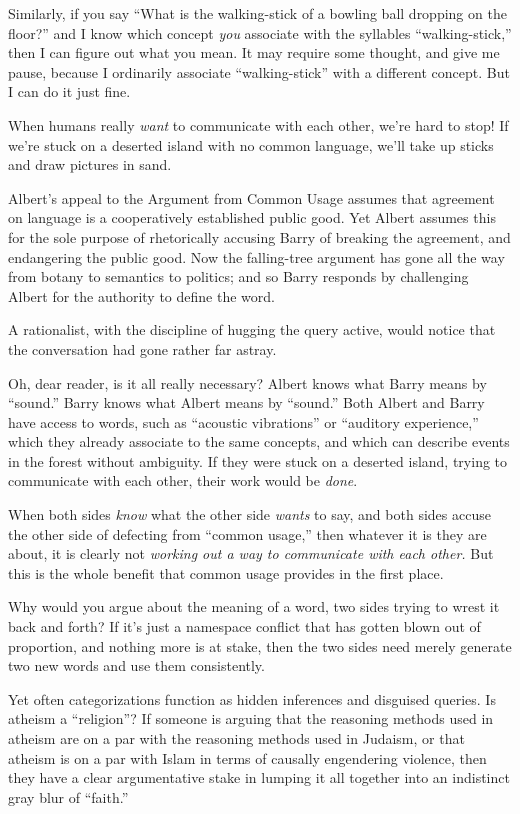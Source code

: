 {
 Similarly, if you say ``What is the walking-stick
of a bowling ball dropping on the floor?'' and I know
which concept \textit{you} associate with the syllables
``walking-stick,'' then I can figure
out what you mean. It may require some thought, and give me pause,
because I ordinarily associate
``walking-stick'' with a different
concept. But I can do it just fine.}

{
 When humans really \textit{want} to communicate with each other,
we're hard to stop! If we're stuck on a
deserted island with no common language, we'll take up
sticks and draw pictures in sand.}

{
 Albert's appeal to the Argument from Common Usage
assumes that agreement on language is a cooperatively established
public good. Yet Albert assumes this for the sole purpose of
rhetorically accusing Barry of breaking the agreement, and endangering
the public good. Now the falling-tree argument has gone all the way
from botany to semantics to politics; and so Barry responds by
challenging Albert for the authority to define the word.}

{
 A rationalist, with the discipline of hugging the query active,
would notice that the conversation had gone rather far astray.}

{
 Oh, dear reader, is it all really necessary? Albert knows what
Barry means by ``sound.'' Barry
knows what Albert means by
``sound.'' Both Albert and Barry
have access to words, such as ``acoustic
vibrations'' or ``auditory
experience,'' which they already associate to the
same concepts, and which can describe events in the forest without
ambiguity. If they were stuck on a deserted island, trying to
communicate with each other, their work would be \textit{done}.}

{
 When both sides \textit{know} what the other side \textit{wants}
to say, and both sides accuse the other side of defecting from
``common usage,'' then whatever it
is they are about, it is clearly not \textit{working out a way to
communicate with each other.} But this is the whole benefit that common
usage provides in the first place.}

{
 Why would you argue about the meaning of a word, two sides trying
to wrest it back and forth? If it's just a namespace
conflict that has gotten blown out of proportion, and nothing more is
at stake, then the two sides need merely generate two new words and use
them consistently.}

{
 Yet often categorizations function as hidden inferences and
disguised queries. Is atheism a
``religion''? If someone is arguing
that the reasoning methods used in atheism are on a par with the
reasoning methods used in Judaism, or that atheism is on a par with
Islam in terms of causally engendering violence, then they have a clear
argumentative stake in lumping it all together into an indistinct gray
blur of ``faith.''}

